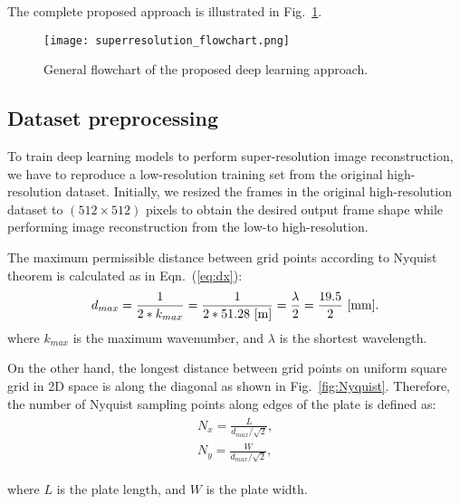 The complete proposed approach is illustrated in Fig.~\ref{fig:flowchart}.
\begin{figure}[!ht]
	\begin{center}
		\texttt{[image: superresolution\_flowchart.png]}
	\end{center}
	\caption{General flowchart of the proposed deep learning approach.} 
	\label{fig:flowchart}
\end{figure}
\subsection{Dataset preprocessing}
To train deep learning models to perform super-resolution image reconstruction, we have to reproduce a low-resolution training set from the original high-resolution dataset. 
Initially, we resized the frames in the original high-resolution dataset to \((512\times512)\) pixels to obtain the desired output frame shape while performing image reconstruction from the low-to high-resolution.

The maximum permissible distance between grid points according to Nyquist theorem is calculated as in Eqn.~(\ref{eq:dx}):
\begin{equation}
	d_{max}= \frac{1}{2*k_{max}} = \frac{1}{2*51.28\ [\textup{m}]} = \frac{\lambda}{2} = \frac{19.5}{2}\ \textup{[mm]}.
	\label{eq:dx}	
\end{equation} 
where $k_{max}$ is the maximum wavenumber, and $\lambda$ is the shortest wavelength.

On the other hand, the longest distance between grid points on uniform square grid in 2D space is along the diagonal as shown in Fig.~\ref{fig:Nyquist}.
Therefore, the number of Nyquist sampling points along edges of the plate is defined as:
\begin{align}
	\begin{split}
		N_x= \frac{L}{d_{max}/\sqrt{2}}, \\
		N_y=  \frac{W}{d_{max}/\sqrt{2}},
	\end{split}
	\label{eq:Nyq}
\end{align}

where $L$ is the plate length, and $W$ is the plate width.

